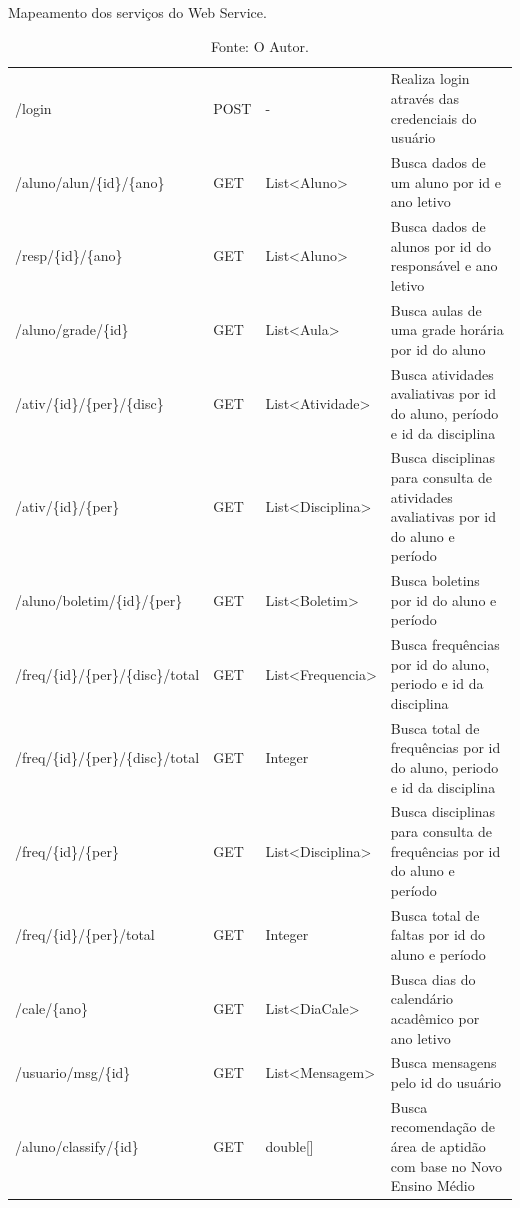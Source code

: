\begin{table}[H]
	\centering
	\caption{Mapeamento dos serviços do Web Service.}
	\renewcommand{\arraystretch}{1.5}
	\begin{tabular}{>{\centering}m{1.8in} >{\centering}m{0.5in} >{\centering}m{1.2in} >{\centering\arraybackslash}m{2.0in}}
	    \hline
		\multicolumn{1}{c|}{\textbf{URI}} 
		& \multicolumn{1}{c|}{\textbf{Método}}
		& \multicolumn{1}{c|}{\textbf{Retorno}}
		& \multicolumn{1}{c}{\textbf{Descrição}}\\
		\hline
		/login & POST & - & Realiza login através das credenciais do usuário \\
		/aluno/alun/\{id\}/\{ano\} & GET & List<Aluno> & Busca dados de um aluno por id e ano letivo \\
		/resp/\{id\}/\{ano\} & GET & List<Aluno> & Busca dados de alunos por id do responsável e ano letivo \\
		/aluno/grade/\{id\} & GET & List<Aula> & Busca aulas de uma grade horária por id do aluno \\
		/ativ/\{id\}/\{per\}/\{disc\} & GET & List<Atividade> & Busca atividades avaliativas por id do aluno, período e id da disciplina \\
		/ativ/\{id\}/\{per\} & GET & List<Disciplina> & Busca disciplinas para consulta de atividades avaliativas por id do aluno e período \\
		/aluno/boletim/\{id\}/\{per\} & GET & List<Boletim> & Busca boletins por id do aluno e período \\
		/freq/\{id\}/\{per\}/\{disc\}/total & GET & List<Frequencia> & Busca frequências por id do aluno, periodo e id da disciplina \\
		/freq/\{id\}/\{per\}/\{disc\}/total & GET & Integer & Busca total de frequências por id do aluno, periodo e id da disciplina \\
		/freq/\{id\}/\{per\} & GET & List<Disciplina> & Busca disciplinas para consulta de frequências por id do aluno e período \\
		/freq/\{id\}/\{per\}/total & GET & Integer & Busca total de faltas por id do aluno e período \\
		/cale/\{ano\} & GET & List<DiaCale> & Busca dias do calendário acadêmico por ano letivo \\
		/usuario/msg/\{id\} & GET & List<Mensagem> & Busca mensagens pelo id do usuário \\
		/aluno/classify/\{id\} & GET & double[] & Busca recomendação de área de aptidão com base no Novo Ensino Médio \\
		\hline
	\end{tabular}
	\label{tabela:app_organizacao}
	\caption*{Fonte: O Autor.}
\end{table}

